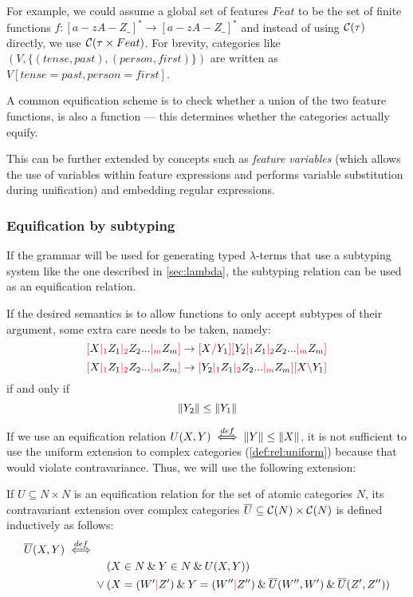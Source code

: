\documentclass[main.tex]{subfiles}
\begin{document}
For example, we could assume a global set of features $Feat$ to be the
set of finite functions $f: [a-zA-Z\_]^* \rightarrow [a-zA-Z\_]^*$
and instead of using $\mathcal{C}( \tau )$ directly, we use $\mathcal{C}( \tau \times Feat )$.
For brevity, categories like $(V, \{ (tense, past), (person, first) \})$
are written as $V[tense=past, person=first]$.

A common equification scheme is to check whether a union of the two feature functions,
is also a function --- this determines whether the categories actually equify.

This can be further extended by concepts such as \emph{feature variables}
(which allows the use of variables within feature expressions and
performs variable substitution during unification) and embedding regular expressions.

\subsubsection{Equification by subtyping}\label{hack:subtyping}
If the grammar will be used for generating typed $\lambda$-terms that use
a subtyping system like the one described in \cref{sec:lambda}, the subtyping
relation can be used as an equification relation.

If the desired semantics is to allow functions to only accept subtypes of
their argument, some extra care needs to be taken, namely:
\[ \textcolor{red}{[} X \textcolor{red}{|_{1}} Z_1 \textcolor{red}{|_{2}} Z_2 ... \textcolor{red}{|_{m}} Z_m \textcolor{red}{]} \rightarrow \textcolor{red}{[} X \textcolor{red}{/} Y_1 \textcolor{red}{]} \textcolor{red}{[} Y_2 \textcolor{red}{|_{1}} Z_1 \textcolor{red}{|_{2}} Z_2 ... \textcolor{red}{|_{m}} Z_m \textcolor{red}{]} \]
\[ \textcolor{red}{[} X \textcolor{red}{|_{1}} Z_1 \textcolor{red}{|_{2}} Z_2 ... \textcolor{red}{|_{m}} Z_m \textcolor{red}{]} \rightarrow \textcolor{red}{[} Y_2 \textcolor{red}{|_{1}} Z_1 \textcolor{red}{|_{2}} Z_2 ... \textcolor{red}{|_{m}} Z_m \textcolor{red}{]} \textcolor{red}{[} X \textcolor{red}{\backslash} Y_1 \textcolor{red}{]} \]
if and only if 
\begin{equation}\label{eq:typeless}
    \|Y_2\| \leq \|Y_1\|
\end{equation}

If we use an equification relation $U(X, Y) \overset{def}{\iff} \|Y\| \leq \|X\|$,
it is not sufficient to use the uniform extension to complex categories
(\cref{def:rel:uniform}) because that would violate contravariance. Thus,
we will use the following extension:
\begin{defn}
    If $U \subseteq N \times N$ is an equification relation
    for the set of
    atomic categories $N$, its contravariant extension over complex categories
    $\overline{U} \subseteq \mathcal{C}( N ) \times \mathcal{C}( N )$ is defined
    inductively as follows:
    \begin{align*}
        \overline{U}(X, Y) \defiff & \\
        & \phantom{{}\lor{}} (X \in N \land Y \in N \land U(X, Y)) \\
        & \lor (X = (W' \mc Z') \land Y = (W'' \mc Z'') \land \overline{U}(W'', W')
        \land \overline{U}(Z', Z'')) \\
    \end{align*}
\end{defn}
\end{document}
